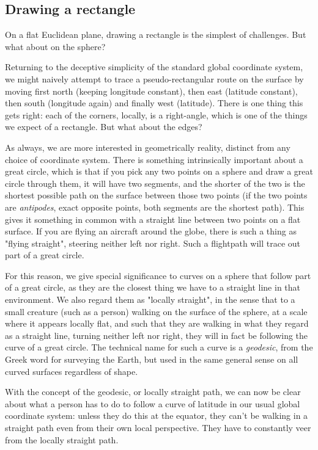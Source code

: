 \subsection{Drawing a rectangle}

On a flat Euclidean plane, drawing a rectangle is the simplest of challenges. But what about on the sphere?

Returning to the deceptive simplicity of the standard global coordinate system, we might naively attempt to trace a pseudo-rectangular route on the surface by moving first north (keeping longitude constant), then east (latitude constant), then south (longitude again) and finally west (latitude). There is one thing this gets right: each of the corners, locally, is a right-angle, which is one of the things we expect of a rectangle. But what about the edges?

As always, we are more interested in geometrically reality, distinct from any choice of coordinate system. There is something intrinsically important about a great circle, which is that if you pick any two points on a sphere and draw a great circle through them, it will have two segments, and the shorter of the two is the shortest possible path on the surface between those two points (if the two points are \textit{antipodes}, exact opposite points, both segments are the shortest path). This gives it something in common with a straight line between two points on a flat surface. If you are flying an aircraft around the globe, there is such a thing as "flying straight", steering neither left nor right. Such a flightpath will trace out part of a great circle.

For this reason, we give special significance to curves on a sphere that follow part of a great circle, as they are the closest thing we have to a straight line in that environment. We also regard them as "locally straight", in the sense that to a small creature (such as a person) walking on the surface of the sphere, at a scale where it appears locally flat, and such that they are walking in what they regard as a straight line, turning neither left nor right, they will in fact be following the curve of a great circle. The technical name for such a curve is a \textit{geodesic}, from the Greek word for surveying the Earth, but used in the same general sense on all curved surfaces regardless of shape.

With the concept of the geodesic, or locally straight path, we can now be clear about what a person has to do to follow a curve of latitude in our usual global coordinate system: unless they do this at the equator, they can't be walking in a straight path even from their own local perspective. They have to constantly veer from the locally straight path.

